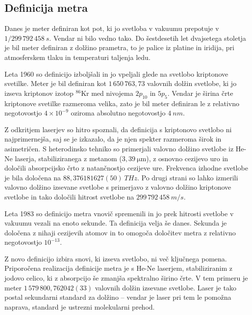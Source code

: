 \subsection*{Definicija metra}
Danes je meter definiran kot pot, ki jo svetloba v vakuumu prepotuje v 
$1/299\,792\,458~\si{s}$.  Vendar ni bilo vedno tako. Do šestdesetih let dvajsetega
stoletja je bil meter definiran z dolžino prametra, to je palice iz platine in iridija, 
pri atmosferskem tlaku in temperaturi taljenja ledu. 

Leta 1960 so definicijo 
izboljšali in jo vpeljali glede na svetlobo kriptonove svetilke. Meter je bil 
definiran kot $1\,650\, 763,73$ valovnih dolžin svetlobe, ki jo izseva kriptonov
izotop $^{86}$Kr med nivojema $2p_{10}$ in $5p_5$. Vendar je širina črte
kriptonove svetilke razmeroma velika, zato je bil meter 
definiran le z relativno negotovostjo $4 \times 10^{-9}$ oziroma absolutno 
negotovostjo $4~\si{nm}$. 

Z odkritjem laserjev so hitro spoznali, da definicija s kriptonovo svetlobo ni 
najprimernejša, saj se je izkazalo, da je njen spekter razmeroma širok in asimetričen. 
S heterodinsko tehniko so primerjali valovno dolžino 
svetlobe 
iz He-Ne laserja, stabiliziranega z metanom ($3,39~\si{\micro\meter}$), z osnovno
cezijevo uro in določili absorpcijsko črto z natančnostjo cezijeve ure.
Frekvenca izhodne svetlobe je bila določena na $88,376181627(50)~\si{THz}$.
Po drugi strani so lahko izmerili valovno dolžino izsevane svetlobe s primerjavo 
z valovno dolžino kriptonove svetlobe in tako določili hitrost svetlobe na
$299\, 792\, 458~\si{m/s}$.

Leta 1983 so definicijo metra vnovič spremenili in jo prek hitrosti svetlobe v
vakuumu vezali na enoto sekunde. Ta definicija velja še danes. Sekunda je določena
z nihaji cezijevih atomov in to omogoča določitev metra z relativno 
negotovostjo $10^{-13}$. 

Z novo definicijo izbira snovi, ki izseva svetlobo, ni več ključnega
pomena. Priporočena realizacija definicije metra je s He-Ne laserjem, 
stabiliziranim z jodovo celico, ki z absorpcijo še zmanjša spektralno širino črte.
V tem primeru je meter $1\,579\,800,762042(33)$ valovnih dolžin izsevane svetlobe. 
Laser je tako postal sekundarni standard za dolžino -- vendar je laser pri tem le pomožna 
naprava, standard je ustrezni molekularni prehod. 

